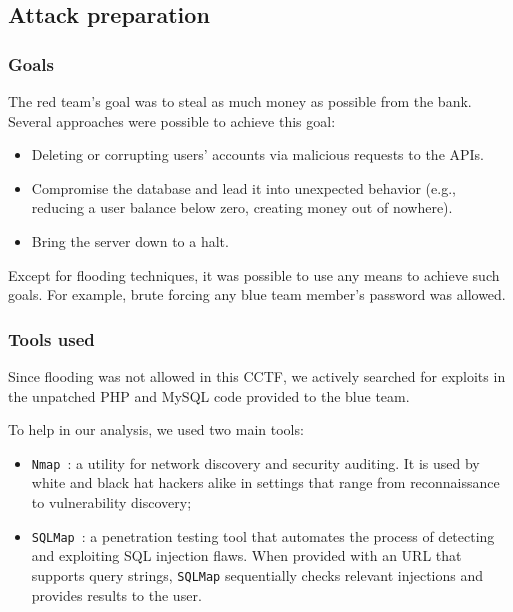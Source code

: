 \subsection{Attack preparation}
\label{sec:cctf-secure:att-prep}

\subsubsection{Goals}
\label{sec:cctf-secure:att-prep:goals}

The red team's goal was to steal as much money as possible from the bank. Several approaches were possible to achieve this goal:

\begin{itemize}
    \item Deleting or corrupting users' accounts via malicious requests to the APIs.
    \item Compromise the database and lead it into unexpected behavior (e.g., reducing a user balance below zero, creating money out of nowhere).
    \item Bring the server down to a halt.
\end{itemize}

Except for flooding techniques, it was possible to use any means to achieve such goals. For example, brute forcing any blue team member's password was allowed.

\subsubsection{Tools used}
\label{sec:cctf-secure:att-prep:tools-used}

Since flooding was not allowed in this CCTF, we actively searched for exploits in the unpatched PHP and MySQL code provided to the blue team.

To help in our analysis, we used two main tools:

\begin{itemize}
    \item \texttt{Nmap}~\cite{nmap}: a utility for network discovery and security auditing. It is used by white and black hat hackers alike in settings that range from reconnaissance to vulnerability discovery;
    \item \texttt{SQLMap}~\cite{sqlmap}: a penetration testing tool that automates the process of detecting and exploiting SQL injection flaws. When provided with an URL that supports query strings, \texttt{SQLMap} sequentially checks relevant injections and provides results to the user.
\end{itemize}

